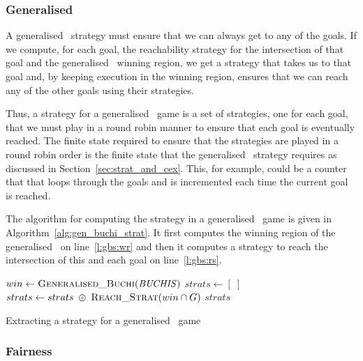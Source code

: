 \subsubsection{Generalised \buchi}

A generalised \buchi\ strategy must ensure that we can always get to any of the goals. If we compute, for each goal, the reachability strategy for the intersection of that goal and the generalised \buchi\ winning region, we get a strategy that takes us to that goal and, by keeping execution in the winning region, ensures that we can reach any of the other goals using their strategies. 

Thus, a strategy for a generalised \buchi\ game is a set of strategies, one for each goal, that we must play in a round robin manner to ensure that each goal is eventually reached. The finite state required to ensure that the strategies are played in a round robin order is the finite state that the generalised \buchi\ strategy requires as discussed in Section~\ref{sec:strat_and_cex}. This, for example, could be a counter that that loops through the goals and is incremented each time the current goal is reached.

The algorithm for computing the strategy in a generalised \buchi\ game is given in Algorithm~\ref{alg:gen_buchi_strat}. It first computes the winning region of the generalised \buchi\ on line~\ref{l:gbs:wr} and then it computes a strategy to reach the intersection of this and each goal on line~\ref{l:gbs:rs}.

\begin{algorithm}
\begin{algorithmic}[1]

\State $win \gets \Call{Generalised\_Buchi}{\genbuchiobj}$ \label{l:gbs:wr}
    \State $strats \gets [\;]$
        \State $strats \gets strats \; \oplus \; \Call{Reach\_Strat}{win \cap G}$ \label{l:gbs:rs}
    \EndFor
    \State \Return $strats$
\EndFunction

\end{algorithmic}
\caption{Extracting a strategy for a generalised \buchi\ game}
\label{alg:gen_buchi_strat}
\end{algorithm}

\subsubsection{Fairness}

